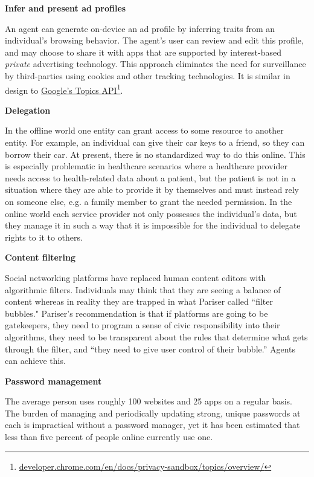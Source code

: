 \documentclass[11pt, oneside]{article}   	%
\newcommand{\hyperfootnote}[1][]{\def\ArgI{{#1}}\hyperfootnoteRelay}
\newcommand\hyperfootnoteRelay[2][]{\href{#1#2}{\ArgI}\footnote{\href{#1#2}{#2}}}
\begin{document}
\textbf{Infer and present ad profiles}

An agent can generate on-device an ad profile by inferring traits from an individual's browsing behavior. The agent's user can review and edit this profile, and may choose to share it with apps that are supported by interest-based \emph{private} advertising technology. This approach eliminates the need for surveillance by third-parties using cookies and other tracking technologies. It is similar in design to \hyperfootnote[Google's Topics API][https://]{developer.chrome.com/en/docs/privacy-sandbox/topics/overview/}.

\textbf{Delegation}

In the offline world one entity can grant access to some resource to another entity. For example, an individual can give their car keys to a friend, so they can borrow their car. At present, there is no standardized way to do this online. This is especially problematic in healthcare scenarios where a healthcare provider needs access to health-related data about a patient, but the patient is not in a situation where they are able to provide it by themselves and must instead rely on someone else, e.g. a family member to grant the needed permission. In the online world each service provider not only possesses the individual's data, but they manage it in such a way that it is impossible for the individual to delegate rights to it to others. 

\textbf{Content filtering}

Social networking platforms have replaced human content editors with algorithmic filters. Individuals may think that they are seeing a balance of content whereas in reality they are trapped in what Pariser called ``filter bubbles."\cite{Pariser2011} Pariser's recommendation is that if platforms are going to be gatekeepers, they need to program a sense of civic responsibility into their algorithms, they need to be transparent about the rules that determine what gets through the filter, and ``they need to give user control of their bubble.''\cite[p66]{McNamee2020} Agents can achieve this.

\textbf{Password management} 

The average person uses roughly 100 websites and 25 apps on a regular basis. The burden of managing and periodically updating strong, unique passwords at each is impractical without a password manager, yet it has been estimated that less than five percent of people online currently use one. 
\end{document}
